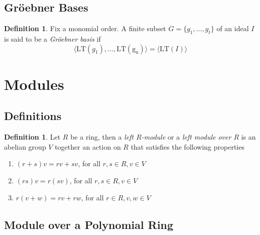 \documentclass{amsart}
\theoremstyle{definition}
\newtheorem{definition}[theorem]{Definition}
\theoremstyle{remark}
\numberwithin{equation}{section}
\begin{document}
\leavevmode


\leavevmode


\subsection{Gr\"oebner Bases}

\begin{definition}
  Fix a monomial order. A finite subset $G = \{ g_1, \ldots, g_t \}$ of an ideal $I$ is said to be a \emph{Gr\"oebner basis} if
  \begin{equation*}
    \langle \mathrm{LT}(g_1), \ldots, \mathrm{LT(g_n)} \rangle = \langle \mathrm{LT}(I) \rangle
  \end{equation*}
\end{definition}


\section{Modules}
\label{sec:modules}

\subsection{Definitions}

\begin{definition}
  Let $R$ be a ring, then a \emph{left $R$-module} or a \emph{left module over $R$} is an abelian group $V$ together an action on $R$ that satisfies the following properties
  \begin{enumerate}[i]
  \item $(r + s)v = rv + sv$, for all $r, s \in R, v \in V$
  \item $(rs)v = r(sv)$, for all $r, s \in R, v \in V$
  \item $r(v + w) = rv + rw$, for all $r \in R, v, w \in V$
  \end{enumerate}
\end{definition}

\subsection{Module over a Polynomial Ring}

\leavevmode \\
\end{document}
